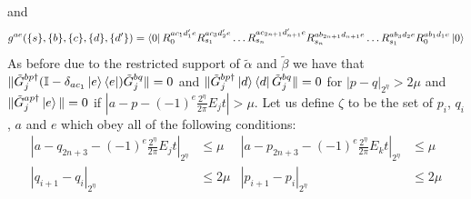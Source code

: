 \documentclass[aps,floatfix,10pt,amssymb,amsfont,amsmath,superscriptaddress,float,nofootinbib,longbibliography,nobalancelastpage,twocolumn]{revtex4-2}
\begin{document}
\begin{widetext}
and 
\begin{equation}
       g^{ae}(\{s\},\{b\},\{c\},\{d\},\{d'\}) = \bra{0}R_0^{ac_1d'_1e}R_{s_1}^{ac_3d'_2e}\ldots R_{s_n}^{ac_{2n+1}d'_{n+1}e}R_{s_n}^{ab_{2n+1}d_{n+1}e}\ldots R_{s_1}^{ab_3d_2e}R_0^{ab_1d_1e}\ket{0}
\end{equation}
As before due to the restricted support of $\tilde \alpha$ and $\tilde \beta$ we have that $\|\tilde G^{bp\dagger}_{j}(\mathbb{I} - \delta_{ac_1}\ket{e}\bra{e})\tilde G^{bq}_{j}\| = 0$ and  $\|\tilde G^{bp\dagger}_{j}\ket{d}\bra{d}\tilde G^{bq}_{j}\| = 0$ for $|p-q|_{2^{\eta}} > 2\mu$ and $\|\tilde G^{ap \dagger}_j \ket{e}\| = 0$ if $|a-p-(-1)^e\frac{2^{\eta}}{2\pi}E_{j}t| > \mu$. Let us define $\zeta$ to be the set of $p_i$, $q_i$, $a$ and $e$ which obey all of the following conditions:
\begin{equation}
\begin{aligned}
    |a-q_{2n+3}-(-1)^e\frac{2^{\eta}}{2\pi}E_jt|_{2^{\eta}} &\leq \mu  &|a-p_{2n+3}-(-1)^e\frac{2^{\eta}}{2\pi}E_kt|_{2^{\eta}} &\leq \mu\\
    |q_{i+1}-q_i|_{2^{\eta}} &\leq 2\mu  &|p_{i+1}-p_i|_{2^{\eta}} &\leq 2\mu\\

\end{aligned}
\end{equation}
\end{widetext}
\end{document}
